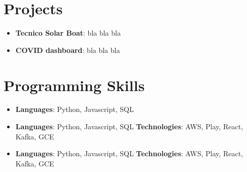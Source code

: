 \documentclass[letterpaper,11pt]{article}
\newcommand{\resumeItem}[2]{
  \item\small{
    \textbf{#1}{: #2 \vspace{-2pt}}
  }
}
\newcommand{\resumeSubItem}[2]{\resumeItem{#1}{#2}\vspace{-4pt}}
\newcommand{\resumeSubHeadingListStart}{\begin{itemize}[leftmargin=*]}
\newcommand{\resumeSubHeadingListEnd}{\end{itemize}}
\begin{document}
\section{Projects}
  \resumeSubHeadingListStart
    \resumeSubItem{Tecnico Solar Boat}
      {bla bla bla}
    \resumeSubItem{COVID dashboard}
      {bla bla bla}
  \resumeSubHeadingListEnd

\section{Programming Skills}
  \resumeSubHeadingListStart
    \resumeSubItem{Languages}{Python, Javascript, SQL}
    \item{
      \textbf{Languages}{: Python, Javascript, SQL}
      \hfill
      \textbf{Technologies}{: AWS, Play, React, Kafka, GCE}
    }
    \item{
      \textbf{Languages}{: Python, Javascript, SQL}
      \hfill
      \textbf{Technologies}{: AWS, Play, React, Kafka, GCE}
    }
  \resumeSubHeadingListEnd


\end{document}
